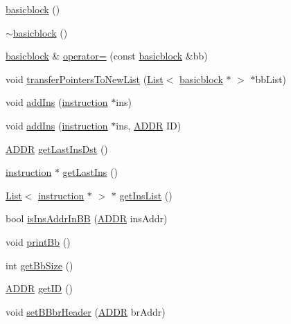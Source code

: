 \begin{DoxyCompactItemize}
\hyperlink{classbasicblock_ac6d735b981c1d367ad93f62ab0394974}{basicblock} ()
\item 
\hyperlink{classbasicblock_a9825a2fafc3b7203bdfe2b0da687bf7d}{$\sim$basicblock} ()
\item 
\hyperlink{classbasicblock}{basicblock} \& \hyperlink{classbasicblock_a7fee16556188be2c9501c1062589e7a6}{operator=} (const \hyperlink{classbasicblock}{basicblock} \&bb)
\item 
void \hyperlink{classbasicblock_a8f58f53b0f1ab88f2909116193cfa953}{transferPointersToNewList} (\hyperlink{classList}{List}$<$ \hyperlink{classbasicblock}{basicblock} $\ast$ $>$ $\ast$bbList)
\item 
void \hyperlink{classbasicblock_a17a204547c41f4ba744ac49b1f375477}{addIns} (\hyperlink{classinstruction}{instruction} $\ast$ins)
\item 
void \hyperlink{classbasicblock_a881f41cc184c5aafa1e0881bb67f6868}{addIns} (\hyperlink{classinstruction}{instruction} $\ast$ins, \hyperlink{binaryTranslator_2global_8h_aa4557b0650cb21e57e3e4623410832c6}{ADDR} ID)
\item 
\hyperlink{binaryTranslator_2global_8h_aa4557b0650cb21e57e3e4623410832c6}{ADDR} \hyperlink{classbasicblock_a5c04fc7ec170aa4d395928b7c4ca0392}{getLastInsDst} ()
\item 
\hyperlink{classinstruction}{instruction} $\ast$ \hyperlink{classbasicblock_a99fb16d14456bb07b0033a0489ced872}{getLastIns} ()
\item 
\hyperlink{classList}{List}$<$ \hyperlink{classinstruction}{instruction} $\ast$ $>$ $\ast$ \hyperlink{classbasicblock_adc40d816c82feedc1f7027fc29470d90}{getInsList} ()
\item 
bool \hyperlink{classbasicblock_afd299af5d08655c4fbd10221f5edb556}{isInsAddrInBB} (\hyperlink{binaryTranslator_2global_8h_aa4557b0650cb21e57e3e4623410832c6}{ADDR} insAddr)
\item 
void \hyperlink{classbasicblock_a1599003c14b63f443c1ca3c48c34238e}{printBb} ()
\item 
int \hyperlink{classbasicblock_a42862e82af55ea72dc2e69ad32f3df29}{getBbSize} ()
\item 
\hyperlink{binaryTranslator_2global_8h_aa4557b0650cb21e57e3e4623410832c6}{ADDR} \hyperlink{classbasicblock_aff434c369968fe5fb3151d8ec00665b4}{getID} ()
\item 
void \hyperlink{classbasicblock_a08a435779d5c69e560f81d76511033f8}{setBBbrHeader} (\hyperlink{binaryTranslator_2global_8h_aa4557b0650cb21e57e3e4623410832c6}{ADDR} brAddr)
\item 

\end{DoxyCompactItemize}
